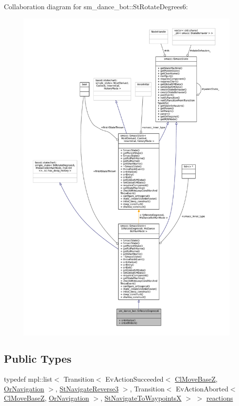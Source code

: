Collaboration diagram for sm\+\_\+dance\+\_\+bot\+:\+:St\+Rotate\+Degrees6\+:
\nopagebreak
\begin{figure}[H]
\begin{center}
\leavevmode
\includegraphics[width=350pt]{structsm__dance__bot_1_1StRotateDegrees6__coll__graph}
\end{center}
\end{figure}
\subsection*{Public Types}
\begin{DoxyCompactItemize}
\item 
typedef mpl\+::list$<$ Transition$<$ Ev\+Action\+Succeeded$<$ \hyperlink{classmove__base__z__client_1_1ClMoveBaseZ}{Cl\+Move\+BaseZ}, \hyperlink{classsm__dance__bot_1_1OrNavigation}{Or\+Navigation} $>$, \hyperlink{structsm__dance__bot_1_1StNavigateReverse3}{St\+Navigate\+Reverse3} $>$, Transition$<$ Ev\+Action\+Aborted$<$ \hyperlink{classmove__base__z__client_1_1ClMoveBaseZ}{Cl\+Move\+BaseZ}, \hyperlink{classsm__dance__bot_1_1OrNavigation}{Or\+Navigation} $>$, \hyperlink{structsm__dance__bot_1_1StNavigateToWaypointsX}{St\+Navigate\+To\+WaypointsX} $>$ $>$ \hyperlink{structsm__dance__bot_1_1StRotateDegrees6_a6f12012f35d4f854115f900ea511d75d}{reactions}
\end{DoxyCompactItemize}
